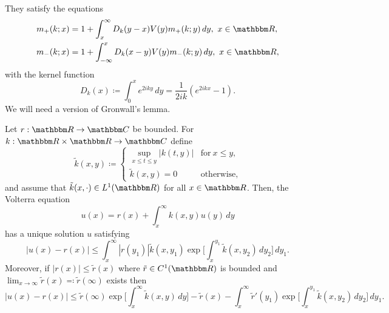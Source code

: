 They satisfy the equations
\begin{equation}\label{lippmann_schwinger_modified}
\begin{aligned}
  m_+(k;x) & = 1 + \int_x^\infty D_k(y-x)V(y)m_+(k;y)\, dy,\ x\in\R, \\
  m_-(k;x) & = 1 + \int_{-\infty}^x D_k(x-y)V(y)m_-(k;y)\, dy,\ x\in\R,
\end{aligned}
\end{equation}
with the kernel function
\begin{equation*}
  D_k(x) \coloneqq \int_0^x e^{2iky}\, dy = \frac{1}{2ik} ( e^{2ikx} - 1 ) .
\end{equation*}
We will need a version of Gronwall's lemma.

\begin{lemma}\label{volterra} 
Let $r:\R\to\C$ be bounded. For $k:\R\times\R\to\C$ define 
\begin{equation*}
  \tilde k(x,y) \coloneqq 
\begin{cases}
   \sup_{x\leq t\leq y} |k(t,y)| & \text{for}\ x\leq y , \\
   \tilde k(x,y) = 0          &  \text{otherwise} ,
\end{cases}
\end{equation*}
and assume that $\tilde{k}(x,\cdot)\in L^1(\R)$ for all $x\in\R$. Then, the Volterra equation
\begin{equation*}
  u(x) = r(x) + \int_x^\infty k(x,y) u(y)\, dy
\end{equation*}
has a unique solution $u$ satisfying
\begin{equation*}
  |u(x)-r(x)| \leq \int_x^\infty |r(y_1)| \tilde k(x,y_1)\exp\Big[ \int_x^{y_1} \tilde k(x,y_2)\, dy_2 \Big]\, dy_1.
\end{equation*}
Moreover, if $|r(x)|\leq\tilde r(x)$ where $\tilde r\in C^1(\R)$ is bounded 
and $\lim_{x\to\infty}\tilde r(x)\eqqcolon \tilde r(\infty)$ exists then
\begin{equation*}
  |u(x)-r(x)| \leq \tilde r(\infty)\exp\big[\int_x^\infty \tilde k(x,y)\, dy \big] - \tilde r(x)
               -\int_x^\infty \tilde r'(y_1) \exp\big[ \int_x^{y_1} \tilde k(x,y_2)\, dy_2\big] \, dy_1 .
\end{equation*}
\end{lemma}
